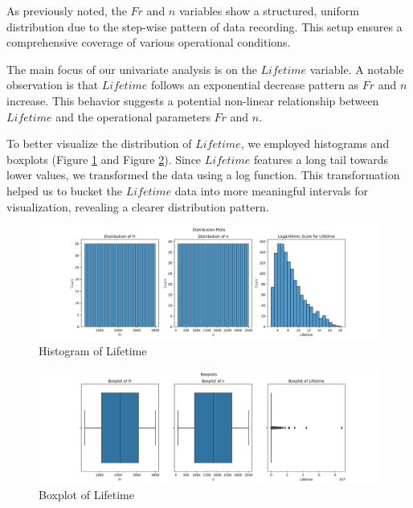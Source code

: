 As previously noted, the $Fr$ and $n$ variables show a structured, uniform distribution due to the step-wise pattern of data recording. This setup ensures a comprehensive coverage of various operational conditions.

The main focus of our univariate analysis is on the $Lifetime$ variable. A notable observation is that $Lifetime$ follows an exponential decrease pattern as $Fr$ and $n$ increase. This behavior suggests a potential non-linear relationship between $Lifetime$ and the operational parameters $Fr$ and $n$.

To better visualize the distribution of $Lifetime$, we employed histograms and boxplots (Figure \ref{fig:bearings-histogram} and Figure \ref{fig:bearings-boxplot}). Since $Lifetime$ features a long tail towards lower values, we transformed the data using a log function. This transformation helped us to bucket the $Lifetime$ data into more meaningful intervals for visualization, revealing a clearer distribution pattern.

\begin{figure}[ht]
    \centering
    \includegraphics[width=\textwidth]{assets/bearings-eda/histogram.png}
    \caption{Histogram of Lifetime}
    \label{fig:bearings-histogram}
\end{figure}

\begin{figure}[ht]
    \centering
    \includegraphics[width=\textwidth]{assets/bearings-eda/boxplot.png}
    \caption{Boxplot of Lifetime}
    \label{fig:bearings-boxplot}
\end{figure}

